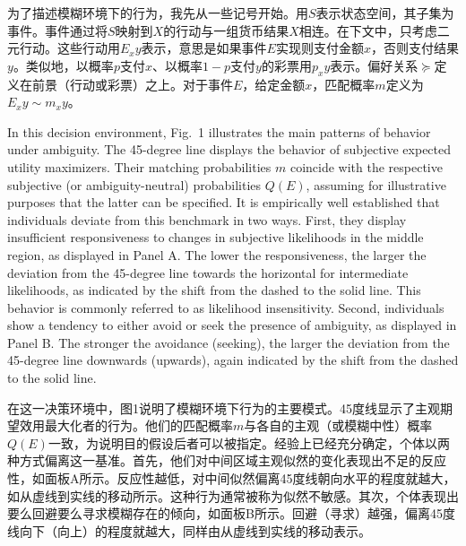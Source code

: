 \documentclass[12pt,a4paper]{article}
\newenvironment{original}
  {\par\medskip\noindent\color{black}\ignorespaces}
  {\par\medskip}
\newenvironment{translation}
  {\par\noindent\color{transblue}\ignorespaces}
  {\par\medskip\medskip}
\begin{document}
\begin{translation}
为了描述模糊环境下的行为，我先从一些记号开始。用$S$表示状态空间，其子集为事件。事件通过将$S$映射到$X$的行动与一组货币结果$X$相连。在下文中，只考虑二元行动。这些行动用$E_x y$表示，意思是如果事件$E$实现则支付金额$x$，否则支付结果$y$。类似地，以概率$p$支付$x$、以概率$1-p$支付$y$的彩票用$p_x y$表示。偏好关系$\succcurlyeq$定义在前景（行动或彩票）之上。对于事件$E$，给定金额$x$，匹配概率$m$定义为$E_x y \sim m_x y$。
\end{translation}

\begin{original}
In this decision environment, Fig.\ 1 illustrates the main patterns of behavior under ambiguity. The 45-degree line displays the behavior of subjective expected utility maximizers. Their matching probabilities $m$ coincide with the respective subjective (or ambiguity-neutral) probabilities $Q(E)$, assuming for illustrative purposes that the latter can be specified. It is empirically well established that individuals deviate from this benchmark in two ways. First, they display insufficient responsiveness to changes in subjective likelihoods in the middle region, as displayed in Panel A. The lower the responsiveness, the larger the deviation from the 45-degree line towards the horizontal for intermediate likelihoods, as indicated by the shift from the dashed to the solid line. This behavior is commonly referred to as likelihood insensitivity. Second, individuals show a tendency to either avoid or seek the presence of ambiguity, as displayed in Panel B. The stronger the avoidance (seeking), the larger the deviation from the 45-degree line downwards (upwards), again indicated by the shift from the dashed to the solid line.
\end{original}

\begin{translation}
在这一决策环境中，图1说明了模糊环境下行为的主要模式。45度线显示了主观期望效用最大化者的行为。他们的匹配概率$m$与各自的主观（或模糊中性）概率$Q(E)$一致，为说明目的假设后者可以被指定。经验上已经充分确定，个体以两种方式偏离这一基准。首先，他们对中间区域主观似然的变化表现出不足的反应性，如面板A所示。反应性越低，对中间似然偏离45度线朝向水平的程度就越大，如从虚线到实线的移动所示。这种行为通常被称为似然不敏感。其次，个体表现出要么回避要么寻求模糊存在的倾向，如面板B所示。回避（寻求）越强，偏离45度线向下（向上）的程度就越大，同样由从虚线到实线的移动表示。
\end{translation}
\end{document}
